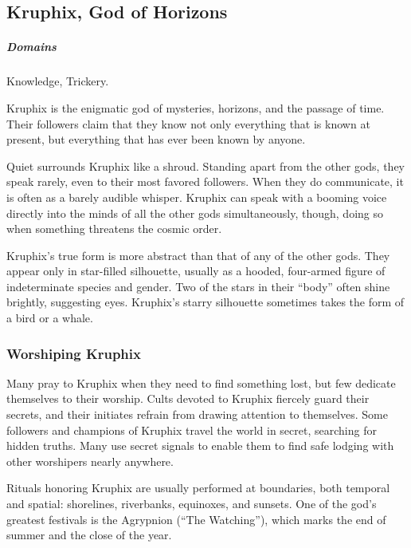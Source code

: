 \subsection*{Kruphix, God of Horizons} \label{ssec::kruphix}
    \subparagraph{Domains} Knowledge, Trickery.

    Kruphix is the enigmatic god of mysteries, horizons, and the passage of time.
    Their followers claim that they know not only everything that is known at present, but everything that has ever been known by anyone.

    Quiet surrounds Kruphix like a shroud.
    Standing apart from the other gods, they speak rarely, even to their most favored followers.
    When they do communicate, it is often as a barely audible whisper.
    Kruphix can speak with a booming voice directly into the minds of all the other gods simultaneously, though, doing so when something threatens the cosmic order.

    Kruphix's true form is more abstract than that of any of the other gods.
    They appear only in star-filled silhouette, usually as a hooded, four-armed figure of indeterminate species and gender.
    Two of the stars in their ``body'' often shine brightly, suggesting eyes.
    Kruphix's starry silhouette sometimes takes the form of a bird or a whale.

    \subsubsection{Worshiping Kruphix}
        Many pray to Kruphix when they need to find something lost, but few dedicate themselves to their worship.
        Cults devoted to Kruphix fiercely guard their secrets, and their initiates refrain from drawing attention to themselves.
        Some followers and champions of Kruphix travel the world in secret, searching for hidden truths.
        Many use secret signals to enable them to find safe lodging with other worshipers nearly anywhere.

        Rituals honoring Kruphix are usually performed at boundaries, both temporal and spatial: shorelines, riverbanks, equinoxes, and sunsets.
        One of the god's greatest festivals is the Agrypnion (``The Watching''), which marks the end of summer and the close of the year.
